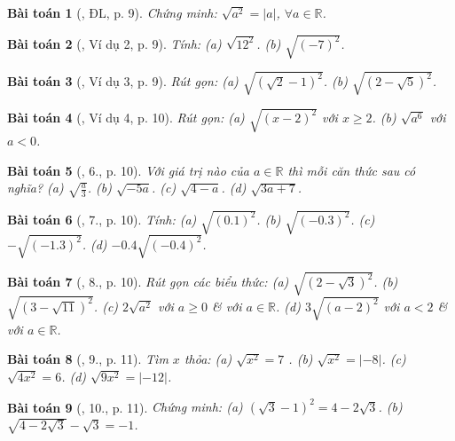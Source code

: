 \documentclass{article}
\newtheorem{baitoan}{Bài toán}
\begin{document}
\begin{baitoan}[\cite{SGK_Toan_9_tap_1}, ĐL, p. 9]
	Chứng minh: $\sqrt{a^2} = |a|$, $\forall a\in\mathbb{R}$.
\end{baitoan}

\begin{baitoan}[\cite{SGK_Toan_9_tap_1}, Ví dụ 2, p. 9]
	Tính: (a) $\sqrt{12^2}$. (b) $\sqrt{(-7)^2}$.
\end{baitoan}

\begin{baitoan}[\cite{SGK_Toan_9_tap_1}, Ví dụ 3, p. 9]
	Rút gọn: (a) $\sqrt{(\sqrt{2} - 1)^2}$. (b) $\sqrt{(2 - \sqrt{5})^2}$.
\end{baitoan}

\begin{baitoan}[\cite{SGK_Toan_9_tap_1}, Ví dụ 4, p. 10]
	Rút gọn: (a) $\sqrt{(x - 2)^2}$ với $x\ge2$. (b) $\sqrt{a^6}$ với $a < 0$.
\end{baitoan}

\begin{baitoan}[\cite{SGK_Toan_9_tap_1}, 6., p. 10]
	Với giá trị nào của $a\in\mathbb{R}$ thì mỗi căn thức sau có nghĩa? (a) $\sqrt{\frac{a}{3}}$. (b) $\sqrt{-5a}$. (c) $\sqrt{4 - a}$. (d) $\sqrt{3a + 7}$.
\end{baitoan}

\begin{baitoan}[\cite{SGK_Toan_9_tap_1}, 7., p. 10]
	Tính: (a) $\sqrt{(0.1)^2}$. (b) $\sqrt{(-0.3)^2}$. (c) $-\sqrt{(-1.3)^2}$. (d) $-0.4\sqrt{(-0.4)^2}$.
\end{baitoan}

\begin{baitoan}[\cite{SGK_Toan_9_tap_1}, 8., p. 10]
	Rút gọn các biểu thức: (a) $\sqrt{(2 - \sqrt{3})^2}$. (b) $\sqrt{(3 - \sqrt{11})^2}$. (c) $2\sqrt{a^2}$ với $a\ge0$ \& với $a\in\mathbb{R}$. (d) $3\sqrt{(a - 2)^2}$ với $a < 2$ \& với $a\in\mathbb{R}$.
\end{baitoan}

\begin{baitoan}[\cite{SGK_Toan_9_tap_1}, 9., p. 11]
	Tìm $x$ thỏa: (a) $\sqrt{x^2} = 7$ . (b) $\sqrt{x^2} = |-8|$. (c) $\sqrt{4x^2} = 6$. (d) $\sqrt{9x^2} = |-12|$.
\end{baitoan}

\begin{baitoan}[\cite{SGK_Toan_9_tap_1}, 10., p. 11]
	Chứng minh: (a) $(\sqrt{3} - 1)^2 = 4 - 2\sqrt{3}$. (b) $\sqrt{4 - 2\sqrt{3}} - \sqrt{3} = -1$.
\end{baitoan}
\end{document}
